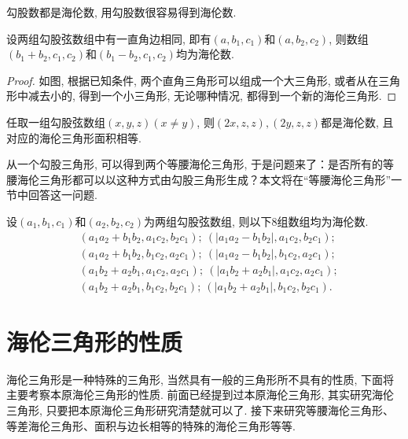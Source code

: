 \documentclass[12pt]{article}
\begin{document}
勾股数都是海伦数, 用勾股数很容易得到海伦数. 

\begin{theorem}
    设两组勾股弦数组中有一直角边相同, 即有$(a,b_1,c_1)$和$(a,b_2,c_2)$, 则数组$(b_1+b_2,c_1,c_2)$和$(b_1-b_2,c_1,c_2)$均为海伦数. 
\end{theorem}
\begin{proof}
如图, 根据已知条件, 两个直角三角形可以组成一个大三角形, 或者从在三角形中减去小的, 得到一个小三角形, 无论哪种情况, 都得到一个新的海伦三角形. \par
\end{proof}

\begin{corollary}\label{shengchengerbei}
    任取一组勾股弦数组$(x,y,z)(x\ne y)$, 则$(2x,z,z),(2y,z,z)$都是海伦数, 且对应的海伦三角形面积相等. 
\end{corollary}

从一个勾股三角形, 可以得到两个等腰海伦三角形, 于是问题来了：是否所有的等腰海伦三角形都可以以这种方式由勾股三角形生成？本文将在“等腰海伦三角形”一节中回答这一问题. 
\begin{theorem}
设$(a_1,b_1,c_1)$和$(a_2,b_2,c_2)$为两组勾股弦数组, 则以下$8$组数组均为海伦数. 
\begin{align*}
&(a_1a_2+b_1b_2,a_1c_2,b_2c_1);\ (|a_1a_2-b_1b_2|,a_1c_2,b_2c_1);\\
&(a_1a_2+b_1b_2,b_1c_2,a_2c_1);\ (|a_1a_2-b_1b_2|,b_1c_2,a_2c_1);\\
&(a_1b_2+a_2b_1,a_1c_2,a_2c_1);\ (|a_1b_2+a_2b_1|,a_1c_2,a_2c_1);\\
&(a_1b_2+a_2b_1,b_1c_2,b_2c_1);\ (|a_1b_2+a_2b_1|,b_1c_2,b_2c_1).
\end{align*}
\end{theorem}



\section{海伦三角形的性质}
海伦三角形是一种特殊的三角形, 当然具有一般的三角形所不具有的性质, 下面将主要考察本原海伦三角形的性质. 前面已经提到过本原海伦三角形, 其实研究海伦三角形, 只要把本原海伦三角形研究清楚就可以了. 接下来研究等腰海伦三角形、等差海伦三角形、面积与边长相等的特殊的海伦三角形等等. 
\end{document}
